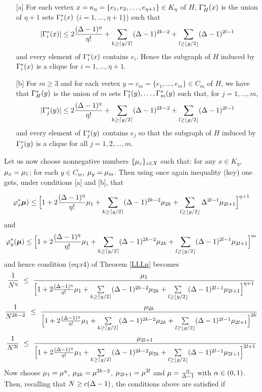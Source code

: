 \documentclass[11pt]{article}
\begin{document}
\begin{itemize}
\item[{[a]}]
For each  vertex $x=\kappa_\eta=\{e_1,e_2,\dots,e_{\eta+1}\}\in K_\eta$ of $H$,
$\Gamma_H^*(x)$ is the union of $\eta+1$ sets $\Gamma_i^*(x)$ ($i=1,\dots ,\eta+1\}$)
such that
$$
|\Gamma_i^*(x)|\le 2{(\Delta-1)^{\eta}\over \eta!} +
\sum_{k\ge \lceil g/2\rceil}(\Delta-1)^{2k-2}+ \sum_{l\ge \lfloor g/2\rfloor}(\Delta-1)^{2l-1}
$$
and every element of $\Gamma_i^*(x)$ contains $e_i$.
Hence  the subgraph of $H$  induced by $\Gamma_i^*(x)$ is a clique for $i=1,\dots ,\eta+1$.
\item[{[b]}]
For $m\ge 3$ and for each  vertex $y=c_m=\{e_1,\dots,e_m\}\in C_m$ of $H$, we have that
$\Gamma_H^*(y)$ is the union of $m$ sets $\Gamma_1^*(y),\dots,\Gamma_{m}^*(y)$ such that,
for $j=1,\dots,  m$,
$$
|\Gamma_j^*(y)|\le 2{(\Delta-1)^{\eta}\over \eta!} +
\sum_{k\ge \lceil g/2\rceil}(\Delta-1)^{2k-2}+ \sum_{l\ge \lfloor g/2\rfloor}(\Delta-1)^{2l-1}
$$
and every element of $\Gamma_{j}^*(y)$ contains $e_j$ so that the subgraph of $H$  induced by $\Gamma_j^*(y)$ is a clique
for all $j=1,2,\dots, m$.
\end{itemize}
Let us now choose nonnegative  numbers $\{\mu_z\}_{z\in X}$ such that: for any $x\in K_\eta$, $\mu_{x}=\mu_1$;  for
each $y\in C_m$,
$\mu_{y}=\mu_m$. Then using once again inequality \equ(key) one gets, under conditions [a] and [b], that


$$
\varphi^{*}_{x}\bm \mu)\le\Big[1+ 2{(\Delta-1)^{\eta}\over \eta!}\mu_{1} + \sum_{k\ge \lceil g/2\rceil}(\Delta-1)^{2k-2}\mu_{2k}+ \sum_{l\ge \lfloor g/2\rfloor}\Delta^{2l-1}\mu_{2l+1}\Big]^{\eta+1}
$$
and
$$
\varphi^{*}_{y}(\bm \mu)\le\Big[1+ 2{(\Delta-1)^{\eta}\over \eta!}\mu_{1} + \sum_{k\ge \lceil g/2\rceil}(\Delta-1)^{2k-2}\mu_{2k}+ \sum_{l\ge \lfloor g/2\rfloor}(\Delta-1)^{2l-1}\mu_{2l+1}\Big]^{m}
$$
and hence condition \equ(eq:r4) of Theorem \ref{LLLn} becomes
$$
{1\over N^{\eta}}~\le ~{\mu_{1}\over \Big[1+ 2{(\Delta-1)^{\eta}\over \eta!}\mu_{1} + \sum\limits_{k\ge \lceil g/2\rceil}(\Delta-1)^{2k-2}\mu_{2k}+ \sum\limits_{l\ge \lfloor g/2\rfloor}(\Delta-1)^{2l-1}\mu_{2l+1}\Big]^{\eta+1}}
$$
$$
 {1\over N^{2k-2}}~\le~ {\mu_{2k}\over \Big[1+ 2{(\Delta-1)^{\eta}\over \eta!}\mu_{1} + \sum\limits_{k\ge \lceil g/2\rceil}(\Delta-1)^{2k-2}\mu_{2k}+ \sum\limits_{l\ge \lfloor g/2\rfloor}(\Delta-1)^{2l-1}\mu_{2l+1}\Big]^{2k}}
$$
$$
 {1\over N^{2l}}~\le ~{\mu_{2l+1}\over \Big[1+ 2{(\Delta-1)^{\eta}\over \eta!}\mu_{1} + \sum\limits_{k\ge \lceil g/2\rceil}(\Delta-1)^{2k-2}\mu_{2k}+ \sum\limits_{l\ge \lfloor g/2\rfloor}(\Delta-1)^{2l-1}\mu_{2l+1}\Big]^{2l+1}}
$$
Now choose $\mu_1=\mu^\eta$, $\mu_{2k}=\mu^{2k-2}$,  $\mu_{2l+1}=\mu^{2l}$ and $\mu={\alpha\over \Delta-1}$  with $\alpha\in (0,1)$. Then,
recalling that $N\ge c(\Delta-1)$, the conditions above are satisfied if
\end{document}
